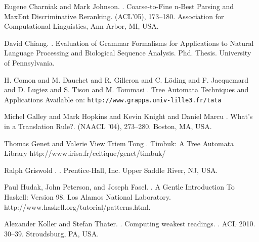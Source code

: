 \documentclass[a4,11pt]{article}
\begin{document}
\begin{thebibliography}{}
Eugene Charniak and Mark Johnson.
.
\newblock Coarse-to-Fine n-Best Parsing and MaxEnt Discriminative Reranking.
 (ACL'05), 173--180.
\newblock Association for Computational Linguistics, Ann Arbor, MI, USA.

David Chiang.
.
\newblock Evaluation of Grammar Formalisms for Applications to Natural Language Processing and Biological Sequence Analysis.
\newblock Phd. Thesis.
\newblock University of Pennsylvania.

H. Comon and M. Dauchet and R. Gilleron and  C. L\"oding and F. Jacquemard and D. Lugiez and S. Tison and M. Tommasi
.
\newblock Tree Automata Techniques and Applications
\newblock Available on: \texttt{http://www.grappa.univ-lille3.fr/tata}

Michel Galley and Mark Hopkins and Kevin Knight and Daniel Marcu
.
\newblock What's in a Translation Rule?.
 (NAACL '04), 273--280.
\newblock Boston, MA, USA.

Thomas Genet and Valerie View Triem Tong
.
\newblock Timbuk: A Tree Automata Library
\newblock http://www.irisa.fr/celtique/genet/timbuk/


Ralph Griswold
.
.
\newblock Prentice-Hall, Inc.
\newblock Upper Saddle River, NJ, USA.


Paul Hudak, John Peterson, and Joseph Fasel.
.
\newblock A Gentle Introduction To Haskell: Version 98.
\newblock Los Alamos National Laboratory. 
\newblock http://www.haskell.org/tutorial/patterns.html.


Alexander Koller and Stefan Thater.
.
\newblock Computing weakest readings.
. ACL 2010.  30--39.
\newblock Stroudsburg, PA, USA.



\end{thebibliography}
\end{document}
